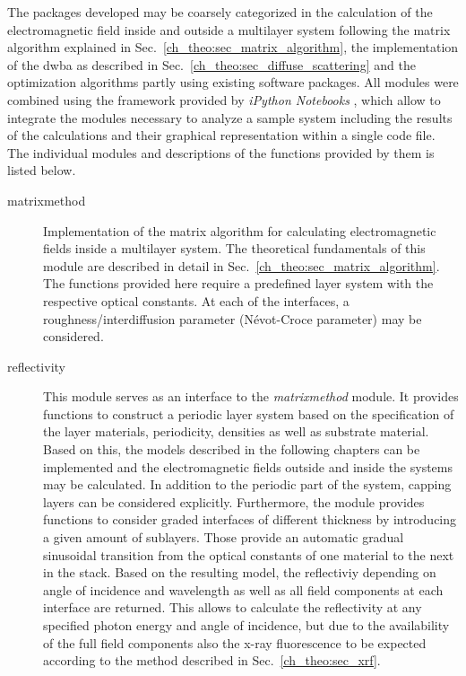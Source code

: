 The packages developed may be coarsely categorized in the calculation of the electromagnetic field inside and outside a multilayer system following the matrix algorithm explained in Sec.~\ref{ch_theo:sec_matrix_algorithm}, the implementation of the \gls{dwba} as described in Sec.~\ref{ch_theo:sec_diffuse_scattering} and the optimization algorithms partly using existing software packages. All modules were combined using the framework provided by \emph{iPython Notebooks} \cite{perez_ipython:_2007}, which allow to integrate the modules necessary to analyze a sample system including the results of the calculations and their graphical representation within a single code file. The individual modules and descriptions of the functions provided by them is listed below.
\begin{description}
 \item[matrixmethod]{Implementation of the matrix algorithm for calculating electromagnetic fields inside a multilayer system. The theoretical fundamentals of this module are described in detail in Sec.~\ref{ch_theo:sec_matrix_algorithm}. The functions provided here require a predefined layer system with the respective optical constants. At each of the interfaces, a roughness/interdiffusion parameter (N\'{e}vot-Croce parameter) may be considered.}
 
 \item[reflectivity]{This module serves as an interface to the \emph{matrixmethod} module. It provides functions to construct a periodic layer system based on the specification of the layer materials, periodicity, densities as well as substrate material. Based on this, the models described in the following chapters can be implemented and the electromagnetic fields outside and inside the systems may be calculated. In addition to the periodic part of the system, capping layers can be considered explicitly. Furthermore, the module provides functions to consider graded interfaces of different thickness by introducing a given amount of sublayers. Those provide an automatic gradual sinusoidal transition from the optical constants of one material to the next in the stack. Based on the resulting model, the reflectiviy depending on angle of incidence and wavelength as well as all field components at each interface are returned. This allows to calculate the reflectivity at any specified photon energy and angle of incidence, but due to the availability of the full field components also the x-ray fluorescence to be expected according to the method described in Sec.~\ref{ch_theo:sec_xrf}.}
 

\end{description}
